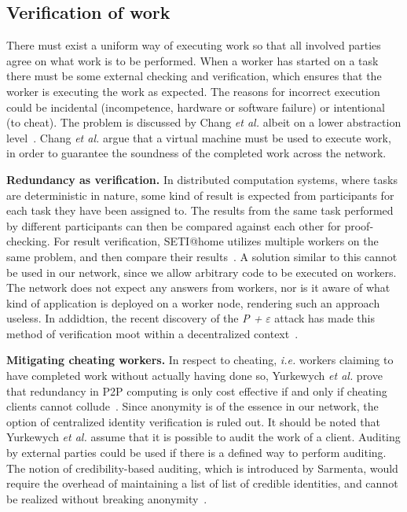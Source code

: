 \subsection{Verification of work}
There must exist a uniform way of executing work so that all involved parties agree on what work is to be performed. When a worker has started on a task there must be some external checking and verification, which ensures that the worker is executing the work as expected. The reasons for incorrect execution could be incidental (incompetence, hardware or software failure) or intentional (to cheat). The problem is discussed by Chang \textit{et al.} albeit on a lower abstraction level~\cite{chang:2002}. Chang \textit{et al.} argue that a virtual machine must be used to execute work, in order to guarantee the soundness of the completed work across the network.

\textbf{Redundancy as verification.} In distributed computation systems, where tasks are deterministic in nature, some kind of result is expected from participants for each task they have been assigned to. The results from the same task performed by different participants can then be compared against each other for proof-checking. For result verification, SETI@home utilizes multiple workers on the same problem, and then compare their results~\cite{korpela:2001}. A solution similar to this cannot be used in our network, since we allow arbitrary code to be executed on workers. The network does not expect any answers from workers, nor is it aware of what kind of application is deployed on a worker node, rendering such an approach useless. In addidtion, the recent discovery of the \emph{P +} $\varepsilon$ attack has made this method of verification moot within a decentralized context~\cite{buterin:2015}.

\textbf{Mitigating cheating workers.}
In respect to cheating, \textit{i.e.} workers claiming to have completed work without actually having done so, Yurkewych \textit{et al.} prove that redundancy in P2P computing is only cost effective if and only if cheating clients cannot collude~\cite{yurkewych:2005}. Since anonymity is of the essence in our network, the option of centralized identity verification is ruled out. It should be noted that Yurkewych \textit{et al.} assume that it is possible to audit the work of a client. Auditing by external parties could be used if there is a defined way to perform auditing. The notion of credibility-based auditing, which is introduced by Sarmenta, would require the overhead of maintaining a list of list of credible identities, and cannot be realized without breaking anonymity~\cite{sarmenta:2002}.

